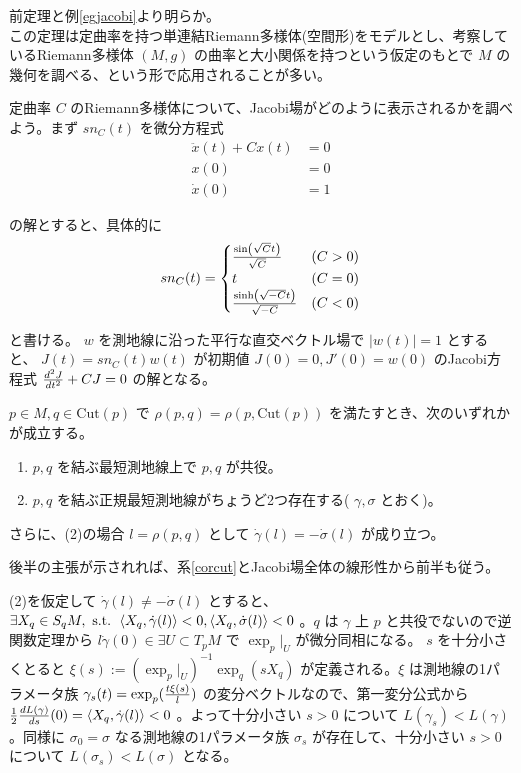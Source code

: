 \documentclass[dvipdfmx,a4paper]{jsreport}
\theoremstyle{definition}
\begin{document}
\prf 前定理と例\ref{egjacobi}より明らか。
\\

この定理は定曲率を持つ単連結Riemann多様体(空間形)をモデルとし、考察しているRiemann多様体 $(M,g)$ の曲率と大小関係を持つという仮定のもとで $M$ の幾何を調べる、という形で応用されることが多い。

定曲率 $C$ のRiemann多様体について、Jacobi場がどのように表示されるかを調べよう。まず $sn_C(t)$ を微分方程式
\begin{align*}
    \ddot{x}(t)+Cx(t)&=0 \\
    x(0)&=0 \\
    \dot{x}(0)&=1
\end{align*}

の解とすると、具体的に
\begin{align*}
    sn_C(t)=\begin{cases}
    {\sin(\sqrt{C}t) \over \sqrt{C}} & (C>0) \\
    t & (C=0) \\
    {\sinh(\sqrt{-C}t) \over \sqrt{-C}} & (C<0)
    \end{cases}
\end{align*}

と書ける。 $w$ を測地線に沿った平行な直交ベクトル場で $|w(t)|=1$ とすると、 $J(t)=sn_C(t)w(t)$ が初期値 $J(0)=0,J'(0)=w(0)$ のJacobi方程式 ${d^2 J \over dt^2}+CJ=0$ の解となる。

\lem $p \in M,q \in \mbox{Cut}(p)$ で $\rho(p,q)=\rho(p,\mbox{Cut}(p))$ を満たすとき、次のいずれかが成立する。
\begin{enumerate}
    \item $p,q$ を結ぶ最短測地線上で $p,q$ が共役。
    \item $p,q$ を結ぶ正規最短測地線がちょうど2つ存在する( $\gamma,\sigma$ とおく)。
\end{enumerate}

さらに、(2)の場合 $l=\rho(p,q)$ として $\dot{\gamma}(l)=-\dot{\sigma}(l)$ が成り立つ。 

\prf 後半の主張が示されれば、系\ref{corcut}とJacobi場全体の線形性から前半も従う。

(2)を仮定して $\dot{\gamma}(l) \neq -\dot{\sigma}(l)$ とすると、$\exists X_q \in S_qM,\mbox{ s.t. } \ev{X_q,\dot{\gamma}(l)}<0,\ev{X_q,\dot{\sigma}(l)}<0$ 。$q$ は $\gamma$ 上 $p$ と共役でないので逆関数定理から $l\dot{\gamma}(0) \in \exists U \subset T_pM$ で $\exp_p|_U$ が微分同相になる。 $s$ を十分小さくとると $\xi(s):=(\exp_p|_U)^{-1}\exp_q(sX_q)$ が定義される。$\xi$ は測地線の1パラメータ族 ${\gamma}_s(t)=\exp_p({t\xi(s) \over l})$ の変分ベクトルなので、第一変分公式から ${1 \over 2}{dL({\gamma}) \over ds}(0)=\ev{X_q,\dot{\gamma}(l)}<0$ 。よって十分小さい $s>0$ について $L({\gamma}_s)<L(\gamma)$ 。同様に $\sigma_0=\sigma$ なる測地線の1パラメータ族 $\sigma_s$ が存在して、十分小さい $s>0$ について $L({\sigma}_s)<L(\sigma)$ となる。
\end{document}
